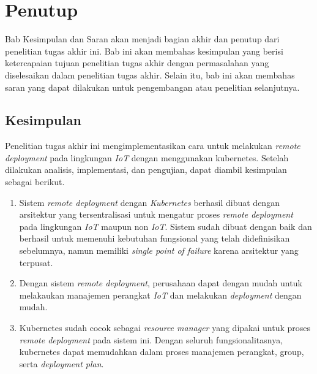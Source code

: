 \chapter{Penutup}

Bab Kesimpulan dan Saran akan menjadi bagian akhir dan penutup dari penelitian tugas akhir ini. Bab ini akan membahas kesimpulan yang berisi ketercapaian tujuan penelitian tugas akhir dengan permasalahan yang diselesaikan dalam penelitian tugas akhir. Selain itu, bab ini akan membahas saran yang dapat dilakukan untuk pengembangan atau penelitian selanjutnya.

\section{Kesimpulan}
Penelitian tugas akhir ini mengimplementasikan cara untuk melakukan \textit{remote deployment} pada lingkungan \textit{IoT} dengan menggunakan kubernetes. Setelah dilakukan analisis, implementasi, dan pengujian, dapat diambil kesimpulan sebagai berikut.
\begin{enumerate}
  \item Sistem \textit{remote deployment} dengan \textit{Kubernetes} berhasil dibuat dengan arsitektur yang tersentralisasi untuk mengatur proses \textit{remote deployment} pada lingkungan \textit{IoT} maupun non \textit{IoT}. Sistem sudah dibuat dengan baik dan berhasil untuk memenuhi kebutuhan fungsional yang telah didefinisikan sebelumnya, namun memiliki \textit{single point of failure} karena arsitektur yang terpusat.
  \item Dengan sistem \textit{remote deployment}, perusahaan dapat dengan mudah untuk melakaukan manajemen perangkat \textit{IoT} dan melakukan \textit{deployment} dengan mudah.
  \item Kubernetes sudah cocok sebagai \textit{resource manager} yang dipakai untuk proses \textit{remote deployment} pada sistem ini. Dengan seluruh fungsionalitasnya, kubernetes dapat memudahkan dalam proses manajemen perangkat, group, serta \textit{deployment plan}.
\end{enumerate}

